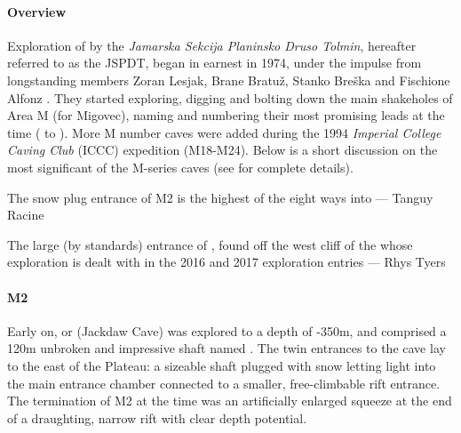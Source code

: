 \paragraph{Overview} Exploration of  by the \textit{Jamarska Sekcija Planinsko Druso Tolmin},  hereafter referred to as the JSPDT, began in earnest in 1974, under the impulse from longstanding members Zoran Lesjak, Brane Bratuž, Stanko Breška and Fischione Alfonz \citep{hm1}. They started exploring, digging and bolting down the main shakeholes of Area M (for Migovec), naming and numbering their most promising leads at the time ( to ). More M number caves were added during the 1994 \textit{Imperial College Caving Club} (ICCC) expedition (M18-M24). Below is a short discussion on the most significant of the M-series caves (see \citet{hm1} for complete details). 

\begin{marginfigure}
\checkoddpage \ifoddpage \forcerectofloat \else \forceversofloat \fi
\centering
 \caption{The snow plug entrance of M2 is the highest of the eight ways into \protect{} --- Tanguy Racine}
 \label{surfaceM2}
\end{marginfigure}

\begin{marginfigure}
\checkoddpage \ifoddpage \forcerectofloat \else \forceversofloat \fi
\centering
 \caption{The large (by \protect{} standards) entrance of \protect{}, found off the west cliff of the \protect{} whose exploration is dealt with in the 2016 and 2017 exploration entries --- Rhys Tyers}
 \label{surfaceM2}
\end{marginfigure}

\paragraph{M2} Early on,  or  (Jackdaw Cave) was explored to a depth of -350m, and comprised a 120m unbroken and impressive shaft named . The twin entrances to the cave lay to the east of the Plateau: a sizeable shaft plugged with snow letting light into the main entrance chamber connected to a smaller, free-climbable rift entrance. The termination of M2 at the time was an artificially enlarged squeeze at the end of a draughting, narrow rift with clear depth potential.

